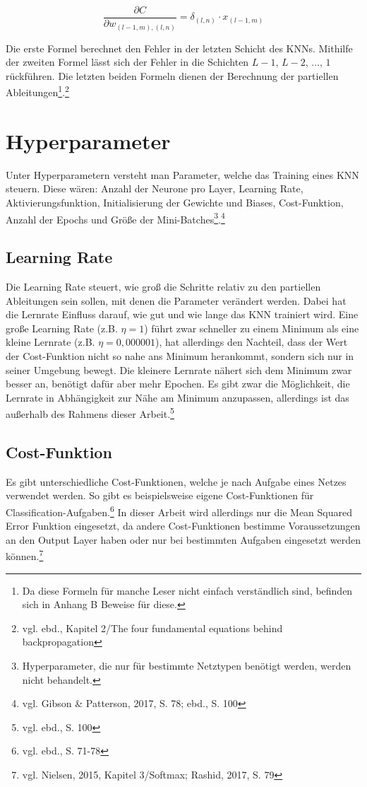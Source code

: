 \documentclass[a4paper,12pt,ngerman,oneside]{scrreprt}	%
\newcommand{\ebd}[1]{vgl. ebd., S. {#1}}
\begin{document}
			\begin{equation}\label{BP4}
				\frac{\partial C}{\partial w_{(l-1,m), (l,n)}} = \delta_{(l,n)} \cdot x_{(l-1,m)}
			\end{equation}
			
			Die erste Formel berechnet den Fehler in der letzten Schicht des KNNs. Mithilfe der zweiten Formel lässt sich der Fehler in die Schichten $L-1$, $L-2$, ..., $1$ rückführen. Die letzten beiden Formeln dienen der Berechnung der partiellen Ableitungen\footnote{Da diese Formeln für manche Leser nicht einfach verständlich sind, befinden sich in Anhang B Beweise für diese.}.\footnote{vgl. ebd., Kapitel 2/The four fundamental equations behind backpropagation}

		\section{Hyperparameter} \label{Hyperparameter}
			Unter Hyperparametern versteht man Parameter, welche das Training eines KNN steuern. Diese wären: Anzahl der Neurone pro Layer, Learning Rate, Aktivierungsfunktion, Initialisierung der Gewichte und Biases, Cost-Funktion, Anzahl der Epochs und Größe der Mini-Batches\footnote{Hyperparameter, die nur für bestimmte Netztypen benötigt werden, werden nicht behandelt.}.\footnote{vgl. Gibson \& Patterson, 2017, S. 78; ebd., S. 100}
			\subsection{Learning Rate}
			Die Learning Rate steuert, wie groß die Schritte relativ zu den partiellen Ableitungen sein sollen, mit denen die Parameter verändert werden. Dabei hat die Lernrate Einfluss darauf, wie gut und wie lange das KNN trainiert wird. Eine große Learning Rate (z.B. $\eta = 1$) führt zwar schneller zu einem Minimum als eine kleine Lernrate (z.B. $\eta = 0,000001$), hat allerdings den Nachteil, dass der Wert der Cost-Funktion nicht so nahe ans Minimum herankommt, sondern sich nur in seiner Umgebung bewegt. Die kleinere Lernrate nähert sich dem Minimum zwar besser an, benötigt \newpage
			dafür aber mehr Epochen. Es gibt zwar die Möglichkeit, die Lernrate in Abhängigkeit zur Nähe am Minimum anzupassen, allerdings ist das außerhalb des Rahmens dieser Arbeit.\footnote{\ebd{100}}
			\subsection{Cost-Funktion}\label{Optimierung:Cost-Funktion}
			Es gibt unterschiedliche Cost-Funktionen, welche je nach Aufgabe eines Netzes verwendet werden. So gibt es beispielsweise eigene Cost-Funktionen für Classification-Aufgaben.\footnote{\ebd{71-78}} In dieser Arbeit wird allerdings nur die Mean Squared Error Funktion eingesetzt, da andere Cost-Funktionen bestimme Voraussetzungen an den Output Layer haben oder nur bei bestimmten Aufgaben eingesetzt werden können.\footnote{vgl. Nielsen, 2015, Kapitel 3/Softmax; Rashid, 2017, S. 79}
			
\end{document}
